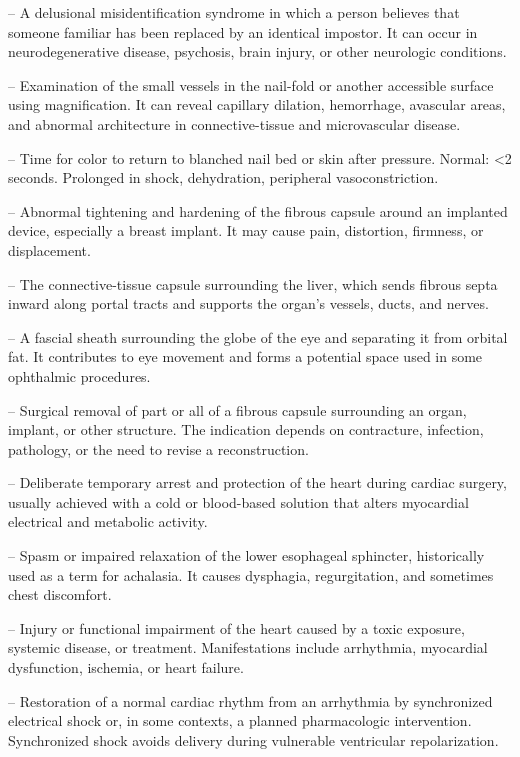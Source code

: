 -- A delusional misidentification syndrome in which a person believes that someone familiar has been replaced by an identical impostor. It can occur in neurodegenerative disease, psychosis, brain injury, or other neurologic conditions.


-- Examination of the small vessels in the nail-fold or another accessible surface using magnification. It can reveal capillary dilation, hemorrhage, avascular areas, and abnormal architecture in connective-tissue and microvascular disease.

-- Time for color to return to blanched nail bed or skin after pressure. Normal: <2 seconds. Prolonged in shock, dehydration, peripheral vasoconstriction.

-- Abnormal tightening and hardening of the fibrous capsule around an implanted device, especially a breast implant. It may cause pain, distortion, firmness, or displacement.

-- The connective-tissue capsule surrounding the liver, which sends fibrous septa inward along portal tracts and supports the organ's vessels, ducts, and nerves.

-- A fascial sheath surrounding the globe of the eye and separating it from orbital fat. It contributes to eye movement and forms a potential space used in some ophthalmic procedures.

-- Surgical removal of part or all of a fibrous capsule surrounding an organ, implant, or other structure. The indication depends on contracture, infection, pathology, or the need to revise a reconstruction.

-- Deliberate temporary arrest and protection of the heart during cardiac surgery, usually achieved with a cold or blood-based solution that alters myocardial electrical and metabolic activity.

-- Spasm or impaired relaxation of the lower esophageal sphincter, historically used as a term for achalasia. It causes dysphagia, regurgitation, and sometimes chest discomfort.

-- Injury or functional impairment of the heart caused by a toxic exposure, systemic disease, or treatment. Manifestations include arrhythmia, myocardial dysfunction, ischemia, or heart failure.

-- Restoration of a normal cardiac rhythm from an arrhythmia by synchronized electrical shock or, in some contexts, a planned pharmacologic intervention. Synchronized shock avoids delivery during vulnerable ventricular repolarization.

